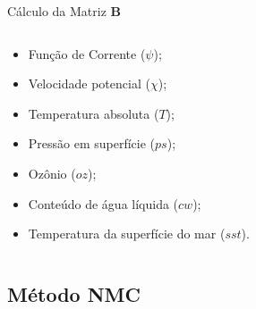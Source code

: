 \documentclass[10pt,aspectratio=169]{beamer}
\begin{document}
\begin{frame}[fragile]{Cálculo da Matriz $\mathbf{B}$}
\begin{columns}
\begin{column}{0.5\textwidth}
      \vspace{1em}
      \begin{itemize}
        \item Função de Corrente ($\psi$);     
        \item Velocidade potencial ($\chi$);
        \item Temperatura absoluta ($T$);
        \item Pressão em superfície ($ps$);
        \item Ozônio ($oz$);
        \item Conteúdo de água líquida ($cw$);
        \item Temperatura da superfície do mar ($sst$).
      \end{itemize}
    \end{column}
  \end{columns}
\end{frame}

\subsection{Método NMC}

\end{document}
